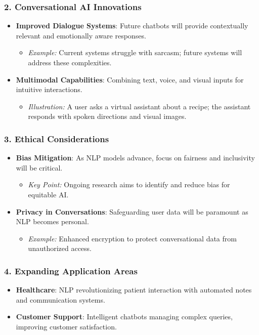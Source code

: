 \documentclass[aspectratio=169]{beamer}
\begin{document}
\begin{frame}[fragile]
    \frametitle{2. Conversational AI Innovations}
    \begin{itemize}
        \item \textbf{Improved Dialogue Systems}: Future chatbots will provide contextually relevant and emotionally aware responses.
        \begin{itemize}
            \item \textit{Example:} Current systems struggle with sarcasm; future systems will address these complexities.
        \end{itemize}
        \item \textbf{Multimodal Capabilities}: Combining text, voice, and visual inputs for intuitive interactions.
        \begin{itemize}
            \item \textit{Illustration:} A user asks a virtual assistant about a recipe; the assistant responds with spoken directions and visual images.
        \end{itemize}
    \end{itemize}
\end{frame}

\begin{frame}[fragile]
    \frametitle{3. Ethical Considerations}
    \begin{itemize}
        \item \textbf{Bias Mitigation}: As NLP models advance, focus on fairness and inclusivity will be critical.
        \begin{itemize}
            \item \textit{Key Point:} Ongoing research aims to identify and reduce bias for equitable AI.
        \end{itemize}
        \item \textbf{Privacy in Conversations}: Safeguarding user data will be paramount as NLP becomes personal.
        \begin{itemize}
            \item \textit{Example:} Enhanced encryption to protect conversational data from unauthorized access.
        \end{itemize}
    \end{itemize}
\end{frame}

\begin{frame}[fragile]
    \frametitle{4. Expanding Application Areas}
    \begin{itemize}
        \item \textbf{Healthcare}: NLP revolutionizing patient interaction with automated notes and communication systems.
        \item \textbf{Customer Support}: Intelligent chatbots managing complex queries, improving customer satisfaction.
    \end{itemize}
\end{frame}
\end{document}
